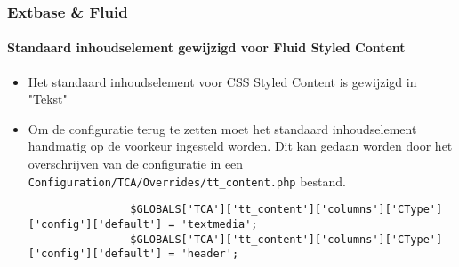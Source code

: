 
\begin{frame}[fragile]
	\frametitle{Extbase \& Fluid}
	\framesubtitle{Standaard inhoudselement gewijzigd voor Fluid Styled Content}

	\lstset{basicstyle=\tiny\ttfamily}

	\begin{itemize}
		\item Het standaard inhoudselement voor CSS Styled Content is gewijzigd in "Tekst"
		\item Om de configuratie terug te zetten moet het standaard inhoudselement handmatig op de voorkeur ingesteld worden.
		 	Dit kan gedaan worden door het overschrijven van de configuratie in een
		 	\texttt{Configuration/TCA/Overrides/tt\_content.php} bestand.

			\begin{lstlisting}
				$GLOBALS['TCA']['tt_content']['columns']['CType']['config']['default'] = 'textmedia';
				$GLOBALS['TCA']['tt_content']['columns']['CType']['config']['default'] = 'header';
			\end{lstlisting}

	\end{itemize}

\end{frame}


